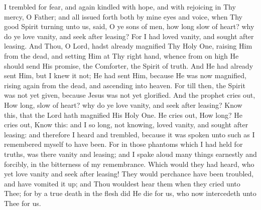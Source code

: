\documentclass[b5paper,openright,12pt,twoside]{book}
\begin{document}
I trembled for fear, and again kindled with hope, and with rejoicing in
Thy mercy, O Father; and all issued forth both by mine eyes and voice,
when Thy good Spirit turning unto us, said, O ye sons of men, how long
slow of heart? why do ye love vanity, and seek after leasing? For I had
loved vanity, and sought after leasing. And Thou, O Lord, hadst already
magnified Thy Holy One, raising Him from the dead, and setting Him at
Thy right hand, whence from on high He should send His promise, the
Comforter, the Spirit of truth. And He had already sent Him, but I knew
it not; He had sent Him, because He was now magnified, rising again from
the dead, and ascending into heaven. For till then, the Spirit was not
yet given, because Jesus was not yet glorified. And the prophet cries
out, How long, slow of heart? why do ye love vanity, and seek after
leasing? Know this, that the Lord hath magnified His Holy One. He cries
out, How long? He cries out, Know this: and I so long, not knowing,
loved vanity, and sought after leasing: and therefore I heard and
trembled, because it was spoken unto such as I remembered myself to
have been. For in those phantoms which I had held for truths, was
there vanity and leasing; and I spake aloud many things earnestly and
forcibly, in the bitterness of my remembrance. Which would they had
heard, who yet love vanity and seek after leasing! They would perchance
have been troubled, and have vomited it up; and Thou wouldest hear them
when they cried unto Thee; for by a true death in the flesh did He die
for us, who now intercedeth unto Thee for us.
\end{document}
